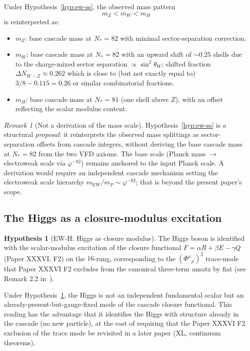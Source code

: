 \documentclass[12pt]{article}
\theoremstyle{definition}
\newtheorem{hypothesis}[theorem]{Hypothesis}
\theoremstyle{remark}
\newtheorem{remark}[theorem]{Remark}
\begin{document}
Under Hypothesis~\ref{hyp:ew-ss}, the observed mass pattern
\begin{equation}
m_Z < m_W < m_H
\end{equation}
is reinterpreted as:
\begin{itemize}
\item $m_Z$: base cascade mass at $N_* = 82$ with minimal sector-separation correction.
\item $m_W$: base cascade mass at $N_* = 82$ with an upward shift of $\sim 0.25$ shells due to the charge-mixed sector separation $\propto \sin^2\theta_W$; shifted fraction $\Delta N_{W-Z} \approx 0.262$ which is close to (but not exactly equal to) $3/8 - 0.115 = 0.26$ or similar combinatorial fractions.
\item $m_H$: base cascade mass at $N_* = 81$ (one shell above $Z$), with an offset reflecting the scalar modulus content.
\end{itemize}

\begin{remark}[Not a derivation of the mass scale]
Hypothesis~\ref{hyp:ew-ss} is a structural \emph{proposal}: it reinterprets the observed mass splittings as sector-separation offsets from cascade integers, without deriving the base cascade mass at $N_* = 82$ from the two VFD axioms. The base scale (Planck mass $\to$ electroweak scale via $\varphi^{-82}$) remains anchored to the input Planck scale. A derivation would require an independent cascade mechanism setting the electroweak scale hierarchy $m_{\mathrm{EW}}/m_P \sim \varphi^{-82}$; that is beyond the present paper's scope.
\end{remark}

\subsection{The Higgs as a closure-modulus excitation}

\begin{hypothesis}[EW-H: Higgs as closure modulus]\label{hyp:higgs}
The Higgs boson is identified with the scalar-modulus excitation of the closure functional $F = \alpha R + \beta E - \gamma Q$ (Paper XXXVI, F2) on the $16$-rung, corresponding to the $(\Phi^\mu{}_\mu)^2$ trace-mode that Paper XXXVI F2 excludes from the canonical three-term ansatz by fiat (see Remark 2.2 in~\citep{SmartXXXVI}).
\end{hypothesis}

Under Hypothesis~\ref{hyp:higgs}, the Higgs is not an independent fundamental scalar but an already-present-but-gauge-fixed mode of the cascade closure functional. This reading has the advantage that it identifies the Higgs with structure already in the cascade (no new particle), at the cost of requiring that the Paper XXXVI F2 exclusion of the trace mode be revisited in a later paper (XL, continuum theorems).
\end{document}
